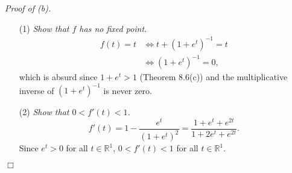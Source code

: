 \documentclass{article}
\begin{document}
\emph{Proof of (b).}
\begin{enumerate}
\item[(1)]
\emph{Show that $f$ has no fixed point.}
\begin{align*}
  f(t) = t
  &\Longleftrightarrow
  t+(1+e^t)^{-1} = t \\
  &\Longleftrightarrow
  (1+e^t)^{-1} = 0,
\end{align*}
which is absurd since $1+e^t > 1$ (Theorem 8.6(c)) and
the multiplicative inverse of $(1+e^t)^{-1}$ is never zero.

\item[(2)]
\emph{Show that $0 < f'(t) < 1$.}
\[
  f'(t) = 1 - \frac{e^t}{(1+e^t)^2} = \frac{1+e^t+e^{2t}}{1+2e^t+e^{2t}}.
\]
Since $e^t > 0$ for all $t \in \mathbb{R}^1$,
$0 < f'(t) < 1$ for all $t \in \mathbb{R}^1$.
\end{enumerate}
$\Box$ \\
\end{document}
